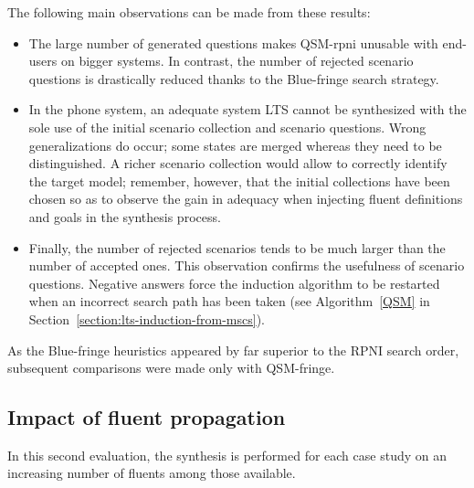 The following main observations can be made from these results:
\begin{itemize}
\item The large number of generated questions makes QSM-rpni unusable with end-users on bigger systems. In contrast, the number of rejected scenario questions is drastically reduced thanks to the Blue-fringe search strategy. 
\item In the phone system, an adequate system LTS cannot be synthesized with the sole use of the initial scenario collection and scenario questions. Wrong generalizations do occur; some states are merged whereas they need to be distinguished. A richer scenario collection would allow to correctly identify the target model; remember, however, that the initial collections have been chosen so as to observe the gain in adequacy when injecting fluent definitions and goals in the synthesis process.
\item Finally, the number of rejected scenarios tends to be much larger than the number of accepted ones. This observation confirms the usefulness of scenario questions. Negative answers force the induction algorithm to be restarted when an incorrect search path has been taken (see Algorithm~\ref{QSM} in Section~\ref{section:lts-induction-from-mscs}).
\end{itemize}

As the Blue-fringe heuristics appeared by far superior to the RPNI search order, subsequent comparisons were made only with QSM-fringe.


\subsection{Impact of fluent propagation}

In this second evaluation, the synthesis is performed for each case study on an increasing number of fluents among those available.

